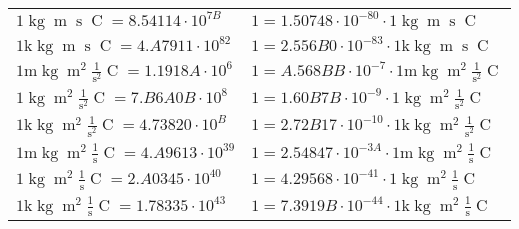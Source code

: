 \begin{center}
\begin{longtable}{l l}
{\color{black}$1 \bm{\mathrm{ }}\operatorname{kg}{\operatorname{m}}{\operatorname{s}}{\operatorname{C}}{} = 8.54114\cdot10^{7B} $}   & {\color{black}$ 1 = 1.50748\cdot10^{-80} \cdot 1 \bm{\mathrm{ }}\operatorname{kg}{\operatorname{m}}{\operatorname{s}}{\operatorname{C}}{}$}  \\
{\color{gray}$1 \bm{\mathrm{ k}}\operatorname{kg}{\operatorname{m}}{\operatorname{s}}{\operatorname{C}}{} = 4.A7911\cdot10^{82} $}   & {\color{gray}$ 1 = 2.556B0\cdot10^{-83} \cdot 1 \bm{\mathrm{ k}}\operatorname{kg}{\operatorname{m}}{\operatorname{s}}{\operatorname{C}}{}$}  \\
{\color{gray}$1 \bm{\mathrm{ m}}\operatorname{kg}{\operatorname{m}^2}\frac1{\operatorname{s}^2}{\operatorname{C}}{} = 1.1918A\cdot10^{6} $}   & {\color{gray}$ 1 = A.568BB\cdot10^{-7} \cdot 1 \bm{\mathrm{ m}}\operatorname{kg}{\operatorname{m}^2}\frac1{\operatorname{s}^2}{\operatorname{C}}{}$}  \\
{\color{black}$1 \bm{\mathrm{ }}\operatorname{kg}{\operatorname{m}^2}\frac1{\operatorname{s}^2}{\operatorname{C}}{} = 7.B6A0B\cdot10^{8} $}   & {\color{black}$ 1 = 1.60B7B\cdot10^{-9} \cdot 1 \bm{\mathrm{ }}\operatorname{kg}{\operatorname{m}^2}\frac1{\operatorname{s}^2}{\operatorname{C}}{}$}  \\
{\color{gray}$1 \bm{\mathrm{ k}}\operatorname{kg}{\operatorname{m}^2}\frac1{\operatorname{s}^2}{\operatorname{C}}{} = 4.73820\cdot10^{B} $}   & {\color{gray}$ 1 = 2.72B17\cdot10^{-10} \cdot 1 \bm{\mathrm{ k}}\operatorname{kg}{\operatorname{m}^2}\frac1{\operatorname{s}^2}{\operatorname{C}}{}$}  \\
{\color{gray}$1 \bm{\mathrm{ m}}\operatorname{kg}{\operatorname{m}^2}\frac1{\operatorname{s}}{\operatorname{C}}{} = 4.A9613\cdot10^{39} $}   & {\color{gray}$ 1 = 2.54847\cdot10^{-3A} \cdot 1 \bm{\mathrm{ m}}\operatorname{kg}{\operatorname{m}^2}\frac1{\operatorname{s}}{\operatorname{C}}{}$}  \\
{\color{black}$1 \bm{\mathrm{ }}\operatorname{kg}{\operatorname{m}^2}\frac1{\operatorname{s}}{\operatorname{C}}{} = 2.A0345\cdot10^{40} $}   & {\color{black}$ 1 = 4.29568\cdot10^{-41} \cdot 1 \bm{\mathrm{ }}\operatorname{kg}{\operatorname{m}^2}\frac1{\operatorname{s}}{\operatorname{C}}{}$}  \\
{\color{gray}$1 \bm{\mathrm{ k}}\operatorname{kg}{\operatorname{m}^2}\frac1{\operatorname{s}}{\operatorname{C}}{} = 1.78335\cdot10^{43} $}   & {\color{gray}$ 1 = 7.3919B\cdot10^{-44} \cdot 1 \bm{\mathrm{ k}}\operatorname{kg}{\operatorname{m}^2}\frac1{\operatorname{s}}{\operatorname{C}}{}$}  \\

\end{longtable}
\end{center}
